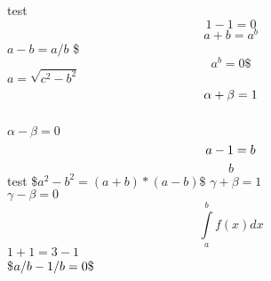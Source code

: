\documentclass{article}
\newcommand{\test}[2]{#1+1=#2-1}
\begin{document}
test
\[1-1=0\]
$$a+b=a^b$$ $a-b=a/b$
\$$$a^b
=0\$$$
$
a=\sqrt{c^2-b^2}
$
\\$$\alpha+\beta=1
\\$$ \\$\alpha-\beta=0$ $$a-1=b\\$$
$$b$$ %
%
test \$$a^2-b^2=(a+b)*(a-b)\$$
$\gamma+\beta=1$
\\$\gamma-\beta=0$
$$\int\limits_a^b f(x)dx$$ $\test{1}{3}$ \\\$$a/b-1/b=0\\\$$
\end{document}
